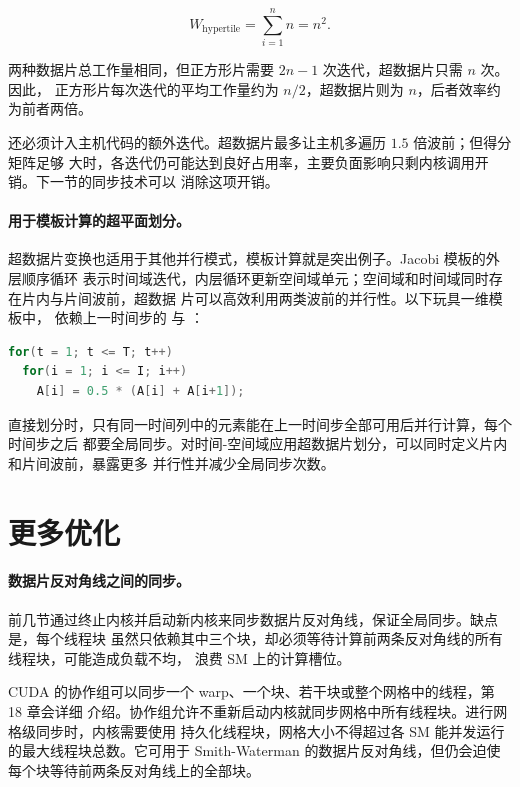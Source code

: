 \begin{equation}
  W_{\text{hypertile}}=\sum_{i=1}^{n}n=n^2.
  \label{eq:16-4}
\end{equation}

两种数据片总工作量相同，但正方形片需要 $2n-1$ 次迭代，超数据片只需 $n$ 次。因此，
正方形片每次迭代的平均工作量约为 $n/2$，超数据片则为 $n$，后者效率约为前者两倍。

还必须计入主机代码的额外迭代。超数据片最多让主机多遍历 $1.5$ 倍波前；但得分矩阵足够
大时，各迭代仍可能达到良好占用率，主要负面影响只剩内核调用开销。下一节的同步技术可以
消除这项开销。

\paragraph{用于模板计算的超平面划分。}
超数据片变换也适用于其他并行模式，模板计算就是突出例子。Jacobi 模板的外层顺序循环
表示时间域迭代，内层循环更新空间域单元；空间域和时间域同时存在片内与片间波前，超数据
片可以高效利用两类波前的并行性。以下玩具一维模板中， 依赖上一时间步的
 与 ：

\begin{lstlisting}[language=C++]
for(t = 1; t <= T; t++)
  for(i = 1; i <= I; i++)
    A[i] = 0.5 * (A[i] + A[i+1]);
\end{lstlisting}

直接划分时，只有同一时间列中的元素能在上一时间步全部可用后并行计算，每个时间步之后
都要全局同步。对时间-空间域应用超数据片划分，可以同时定义片内和片间波前，暴露更多
并行性并减少全局同步次数。

\section{更多优化}
\label{sec:wavefront-more-optimizations}

\paragraph{数据片反对角线之间的同步。}
前几节通过终止内核并启动新内核来同步数据片反对角线，保证全局同步。缺点是，每个线程块
虽然只依赖其中三个块，却必须等待计算前两条反对角线的所有线程块，可能造成负载不均，
浪费 SM 上的计算槽位。

CUDA 的协作组可以同步一个 warp、一个块、若干块或整个网格中的线程，第 18 章会详细
介绍。协作组允许不重新启动内核就同步网格中所有线程块。进行网格级同步时，内核需要使用
持久化线程块，网格大小不得超过各 SM 能并发运行的最大线程块总数。它可用于
Smith-Waterman 的数据片反对角线，但仍会迫使每个块等待前两条反对角线上的全部块。

